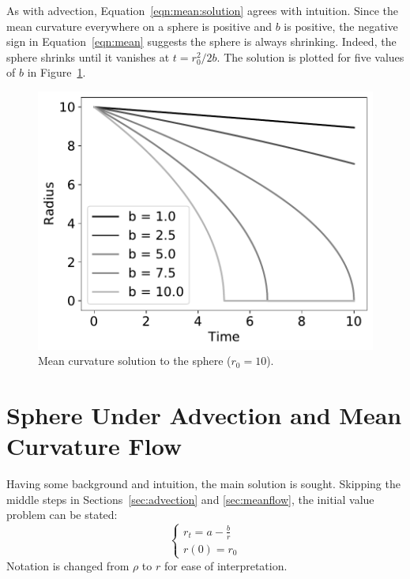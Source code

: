 \documentclass[journal]{IEEEtran}
\begin{document}
As with advection, Equation~\ref{eqn:mean:solution} agrees with intuition.
Since the mean curvature everywhere on a sphere is positive and $b$ is positive, the negative sign in Equation~\ref{eqn:mean} suggests the sphere is always shrinking.
Indeed, the sphere shrinks until it vanishes at $t = r_0^2/2b$.
The solution is plotted for five values of $b$ in Figure~\ref{fig:mean}.

\begin{figure}[t]
  \centering
    \includegraphics[width=0.9\linewidth]{mean}%
  \caption{Mean curvature solution to the sphere ($r_0 = 10$).}
  \label{fig:mean}
\end{figure}

\section{Sphere Under Advection and Mean Curvature Flow}
Having some background and intuition, the main solution is sought.
Skipping the middle steps in Sections~\ref{sec:advection} and \ref{sec:meanflow}, the initial value problem can be stated:
\begin{equation}
  \label{eqn:base}
  \left\{
    \begin{array}{ll}
      r_t = a - \frac{b}{r}\\
      r(0) = r_0
    \end{array}
  \right.
\end{equation}
Notation is changed from $\rho$ to $r$ for ease of interpretation.
\end{document}
